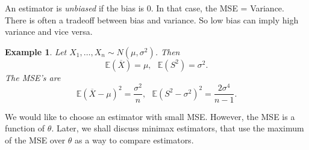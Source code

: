 \documentclass[twoside,12pt]{article}
\newtheorem{example}[theorem]{Example}
\newcommand\E{\mathbb{E}}
\begin{document}
An estimator is {\em unbiased} if
the bias is 0.
In that case,
the MSE = Variance.
There is often a tradeoff between bias and variance.
So low bias can imply high variance and vice versa.

\begin{example}
Let $X_1,\ldots, X_n \sim N(\mu,\sigma^2)$.
Then
$$
\E(\overline{X}) = \mu,\ \ \ 
\E(S^2) = \sigma^2.
$$
The MSE's are
$$
\E(\overline{X}-\mu)^2 = \frac{\sigma^2}{n},\ \ \ 
\E(S^2-\sigma^2)^2 = \frac{2\sigma^4}{n-1}.
$$
\end{example}

We would like to choose an estimator with small MSE.
However, the MSE is a function of $\theta$.
Later, we shall discuss minimax estimators,
that use the maximum of the MSE over $\theta$
as a way to compare estimators.
\end{document}
